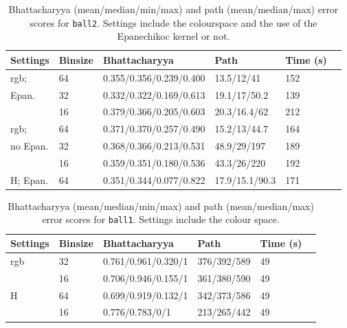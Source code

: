 \documentclass[a4paper,11pt]{article}
\begin{document}
\begin{table}
  \centering
  \small
  \begin{tabular}{|l|l||l|l|l|l|}
    \hline
    Settings  & Binsize & Bhattacharyya & Path & Time (s)\\
    \hline
    rgb;      &  64    & 0.355/0.356/0.239/0.400 & 13.5/12/41     & 152\\
    Epan.     &  32    & 0.332/0.322/0.169/0.613 & 19.1/17/50.2   & 139\\
              &  16    & 0.379/0.366/0.205/0.603 & 20.3/16.4/62   & 212\\
    \hline
    rgb;      &  64    & 0.371/0.370/0.257/0.490 & 15.2/13/44.7   & 164\\
    no Epan.  &  32    & 0.368/0.366/0.213/0.531 & 48.9/29/197    & 189\\
              &  16    & 0.359/0.351/0.180/0.536 & 43.3/26/220    & 192\\
    \hline               
    H; Epan.  &  64    & 0.351/0.344/0.077/0.822 & 17.9/15.1/90.3 & 171\\
    \hline
  \end{tabular}
  \caption{Bhattacharyya (mean/median/min/max) and path (mean/median/max) error scores for \texttt{ball2}. Settings include the colourspace and the use of the Epanechikoc kernel or not.}
  \label{tab:error:ball2}
\end{table}

\begin{table}
  \centering
  \small
  \begin{tabular}{|l|l||l|l|l|l|}
    \hline
    Settings  & Binsize & Bhattacharyya & Path & Time (s)\\
    \hline
    rgb       &  32    & 0.761/0.961/0.320/1 & 376/392/589 & 49\\
              &  16    & 0.706/0.946/0.155/1 & 361/380/590 & 49\\
    \hline               
    H         &  64    & 0.699/0.919/0.132/1 & 342/373/586 & 49\\
              &  16    & 0.776/0.783/0/1     & 213/265/442 & 49\\
    \hline
  \end{tabular}
  \caption{Bhattacharyya (mean/median/min/max) and path (mean/median/max) error scores for \texttt{ball1}. Settings include the colour space.}
  \label{tab:error:ball1}
\end{table}
\end{document}
